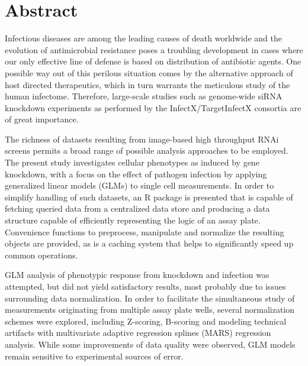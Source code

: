 \chapter{Abstract}

Infectious diseases are among the leading causes of death worldwide and the evolution of antimicrobial resistance poses a troubling development in cases where our only effective line of defense is based on distribution of antibiotic agents. One possible way out of this perilous situation comes by the alternative approach of host directed therapeutics, which in turn warrants the meticulous study of the human infectome. Therefore, large-scale studies such as genome-wide siRNA knockdown experiments as performed by the InfectX/TargetInfectX consortia are of great importance.

The richness of datasets resulting from image-based high throughput RNAi screens permits a broad range of possible analysis approaches to be employed. The present study investigates cellular phenotypes as induced by gene knockdown, with a focus on the effect of pathogen infection by applying generalized linear models (GLMs) to single cell measurements. In order to simplify handling of such datasets, an R package is presented that is capable of fetching queried data from a centralized data store and producing a data structure capable of efficiently representing the logic of an assay plate. Convenience functions to preprocess, manipulate and normalize the resulting objects are provided, as is a caching system that helps to significantly speed up common operations.

GLM analysis of phenotypic response from knockdown and infection was attempted, but did not yield satisfactory results, most probably due to issues surrounding data normalization. In order to facilitate the simultaneous study of measurements originating from multiple assay plate wells, several normalization schemes were explored, including Z-scoring, B-scoring and modeling technical artifacts with multivariate adaptive regression splines (MARS) regression analysis. While some improvements of data quality were observed, GLM models remain sensitive to experimental sources of error.